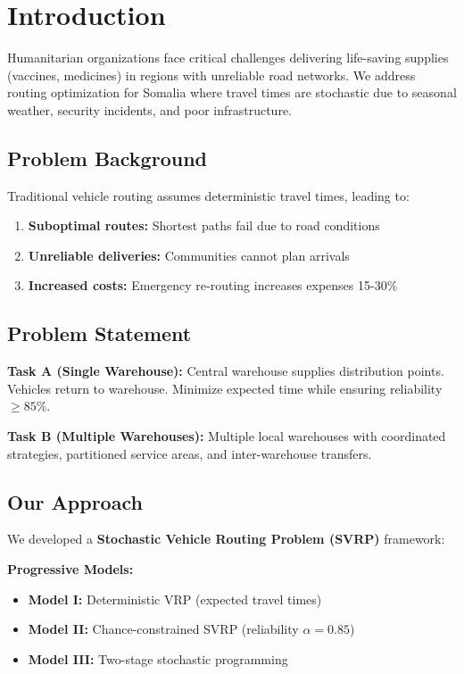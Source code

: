 \section{Introduction}

Humanitarian organizations face critical challenges delivering life-saving supplies (vaccines, medicines) in regions with unreliable road networks. We address routing optimization for Somalia where travel times are stochastic due to seasonal weather, security incidents, and poor infrastructure.

\subsection{Problem Background}

Traditional vehicle routing assumes deterministic travel times, leading to:
\begin{enumerate}
\item \textbf{Suboptimal routes:} Shortest paths fail due to road conditions
\item \textbf{Unreliable deliveries:} Communities cannot plan arrivals
\item \textbf{Increased costs:} Emergency re-routing increases expenses 15-30\%
\end{enumerate}

\subsection{Problem Statement}

\textbf{Task A (Single Warehouse):} Central warehouse supplies distribution points. Vehicles return to warehouse. Minimize expected time while ensuring reliability $\geq 85\%$.

\textbf{Task B (Multiple Warehouses):} Multiple local warehouses with coordinated strategies, partitioned service areas, and inter-warehouse transfers.

\subsection{Our Approach}

We developed a \textbf{Stochastic Vehicle Routing Problem (SVRP)} framework:

\noindent \textbf{Progressive Models:}
\begin{itemize}
\item \textbf{Model I:} Deterministic VRP (expected travel times)
\item \textbf{Model II:} Chance-constrained SVRP (reliability $\alpha = 0.85$)
\item \textbf{Model III:} Two-stage stochastic programming
\end{itemize}

